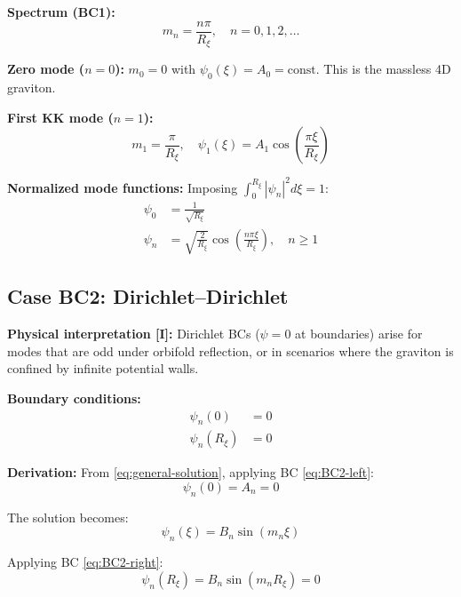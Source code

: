\documentclass[11pt,a4paper]{article}
\newcommand{\Rxi}{R_\xi}
\begin{document}
\textbf{Spectrum (BC1):}
\begin{equation}
\boxed{m_n = \frac{n\pi}{\Rxi}, \quad n = 0, 1, 2, \ldots}
\label{eq:spectrum-BC1}
\end{equation}

\textbf{Zero mode ($n=0$):} $m_0 = 0$ with $\psi_0(\xi) = A_0 = \mathrm{const}$.
This is the massless 4D graviton.

\textbf{First KK mode ($n=1$):}
\begin{equation}
m_1 = \frac{\pi}{\Rxi}, \quad \psi_1(\xi) = A_1 \cos\left(\frac{\pi\xi}{\Rxi}\right)
\label{eq:BC1-first-mode}
\end{equation}

\textbf{Normalized mode functions:} Imposing $\int_0^{\Rxi} |\psi_n|^2 d\xi = 1$:
\begin{align}
\psi_0 &= \frac{1}{\sqrt{\Rxi}} \label{eq:BC1-psi0-norm}\\
\psi_n &= \sqrt{\frac{2}{\Rxi}} \cos\left(\frac{n\pi\xi}{\Rxi}\right), \quad n \geq 1
\label{eq:BC1-psin-norm}
\end{align}

\subsection{Case BC2: Dirichlet--Dirichlet}

\textbf{Physical interpretation [I]:} Dirichlet BCs ($\psi = 0$ at boundaries) arise
for modes that are odd under orbifold reflection, or in scenarios where the graviton
is confined by infinite potential walls.

\textbf{Boundary conditions:}
\begin{align}
\psi_n(0) &= 0 \label{eq:BC2-left}\\
\psi_n(\Rxi) &= 0 \label{eq:BC2-right}
\end{align}

\textbf{Derivation:} From \eqref{eq:general-solution}, applying BC \eqref{eq:BC2-left}:
\begin{equation}
\psi_n(0) = A_n = 0
\label{eq:BC2-left-applied}
\end{equation}

The solution becomes:
\begin{equation}
\psi_n(\xi) = B_n \sin(m_n \xi)
\label{eq:BC2-solution-form}
\end{equation}

Applying BC \eqref{eq:BC2-right}:
\begin{equation}
\psi_n(\Rxi) = B_n \sin(m_n \Rxi) = 0
\label{eq:BC2-right-applied}
\end{equation}
\end{document}
